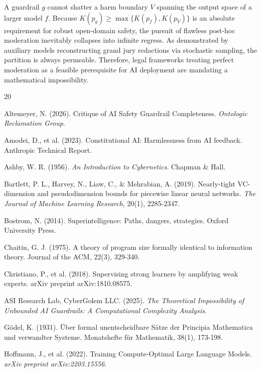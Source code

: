 \documentclass[11pt,twoside,letterpaper]{article}
\begin{document}
A guardrail $g$ cannot shatter a harm boundary $V$ spanning the output space of a larger model $f$. Because $K(p_g) \geq \max\{K(p_f), K(p_V)\}$ is an absolute requirement for robust open-domain safety, the pursuit of flawless post-hoc moderation inevitably collapses into infinite regress. As demonstrated by 
auxiliary models reconstructing grand jury redactions via stochastic sampling, 
the partition is always permeable. Therefore, legal frameworks treating perfect moderation as a feasible prerequisite for AI deployment are mandating a mathematical impossibility.

\begin{thebibliography}{20}

Altemeyer, N. (2026). Critique of AI Safety Guardrail Completeness. \textit{Ontologic Reclamation Group}.

Amodei, D., et al. (2023). Constitutional AI: Harmlessness from AI feedback. Anthropic Technical Report.

Ashby, W. R. (1956). \textit{An Introduction to Cybernetics}. Chapman \& Hall.

Bartlett, P. L., Harvey, N., Liaw, C., \& Mehrabian, A. (2019). Nearly-tight VC-dimension and pseudodimension bounds for piecewise linear neural networks. \textit{The Journal of Machine Learning Research}, 20(1), 2285-2347.

Bostrom, N. (2014). Superintelligence: Paths, dangers, strategies. Oxford University Press.

Chaitin, G. J. (1975). A theory of program size formally identical to information theory. Journal of the ACM, 22(3), 329-340.

Christiano, P., et al. (2018). Supervising strong learners by amplifying weak experts. arXiv preprint arXiv:1810.08575.

ASI Research Lab, CyberGolem LLC. (2025). \textit{The Theoretical Impossibility of Unbounded AI Guardrails: A Computational Complexity Analysis}.

Gödel, K. (1931). Über formal unentscheidbare Sätze der Principia Mathematica und verwandter Systeme. Monatshefte für Mathematik, 38(1), 173-198.

Hoffmann, J., et al. (2022). Training Compute-Optimal Large Language Models. \textit{arXiv preprint arXiv:2203.15556}.


\end{thebibliography}
\end{document}
